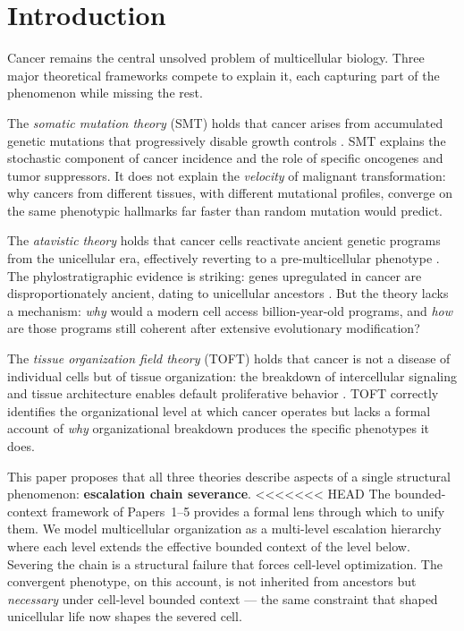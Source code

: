 \documentclass[11pt]{article}
\theoremstyle{definition}
\theoremstyle{remark}
\begin{document}
\section{Introduction}
\label{sec:intro}

Cancer remains the central unsolved problem of multicellular biology.
Three major theoretical frameworks compete to explain it, each
capturing part of the phenomenon while missing the rest.

The \emph{somatic mutation theory} (SMT) holds that cancer arises from
accumulated genetic mutations that progressively disable growth
controls \cite{Vogelstein2013, Nowell1976}. SMT explains the
stochastic component of cancer incidence and the role of specific
oncogenes and tumor suppressors. It does not explain the \emph{velocity}
of malignant transformation: why cancers from different tissues, with
different mutational profiles, converge on the same phenotypic
hallmarks \cite{Hanahan2011} far faster than random mutation would
predict.

The \emph{atavistic theory} holds that cancer cells reactivate ancient
genetic programs from the unicellular era, effectively reverting to a
pre-multicellular phenotype \cite{Davies2011, Trigos2017}. The
phylostratigraphic evidence is striking: genes upregulated in cancer
are disproportionately ancient, dating to unicellular ancestors
\cite{Trigos2017}. But the theory lacks a mechanism: \emph{why} would
a modern cell access billion-year-old programs, and \emph{how} are
those programs still coherent after extensive evolutionary modification?

The \emph{tissue organization field theory} (TOFT) holds that cancer
is not a disease of individual cells but of tissue organization:
the breakdown of intercellular signaling and tissue architecture
enables default proliferative behavior \cite{Sonnenschein2000}. TOFT
correctly identifies the organizational level at which cancer operates
but lacks a formal account of \emph{why} organizational breakdown
produces the specific phenotypes it does.

This paper proposes that all three theories describe aspects of a
single structural phenomenon: \textbf{escalation chain severance}.
<<<<<<< HEAD
The bounded-context framework of Papers~1--5
\cite{McCarthy2026a, McCarthy2026b, McCarthy2026c, McCarthy2026d, McCarthy2026e}
provides a formal lens through which to unify them. We model
multicellular organization as a multi-level escalation hierarchy
where each level extends the effective bounded context of the level
below. Severing the chain is a structural failure that forces
cell-level optimization. The convergent phenotype, on this account,
is not inherited from ancestors but \emph{necessary} under cell-level
bounded context --- the same constraint that shaped unicellular life
now shapes the severed cell.
\end{document}
